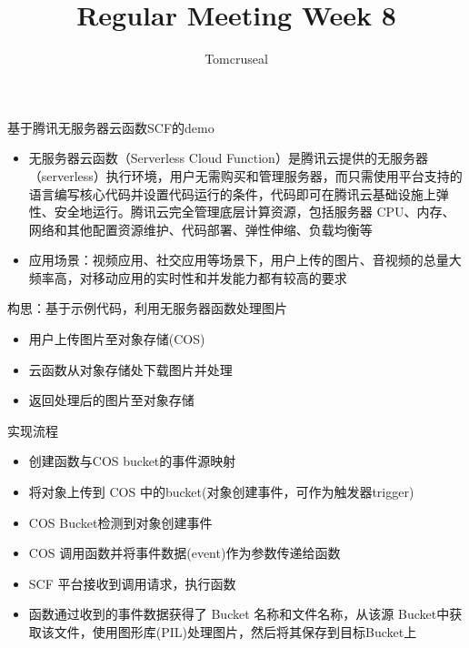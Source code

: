 \documentclass{beamer}
\author{Tomcruseal}
\title{Regular Meeting Week 8}
\institute{School of Computer Science and Technology SCUT }
\begin{document}
	\frame{\titlepage}
	



   
    \begin{frame}基于腾讯无服务器云函数SCF的demo
    	\begin{itemize}
    		\item 无服务器云函数（Serverless Cloud Function）是腾讯云提供的无服务器（serverless）执行环境，用户无需购买和管理服务器，而只需使用平台支持的语言编写核心代码并设置代码运行的条件，代码即可在腾讯云基础设施上弹性、安全地运行。腾讯云完全管理底层计算资源，包括服务器 CPU、内存、网络和其他配置资源维护、代码部署、弹性伸缩、负载均衡等
    	\end{itemize}
        
    \end{frame}
    
    \begin{frame}
    	\begin{itemize}
    		\item 应用场景：视频应用、社交应用等场景下，用户上传的图片、音视频的总量大频率高，对移动应用的实时性和并发能力都有较高的要求
        \end{itemize}
    \end{frame}

    \begin{frame}构思：基于示例代码，利用无服务器函数处理图片
        \begin{itemize}
        	\item 用户上传图片至对象存储(COS)
        	\item 云函数从对象存储处下载图片并处理
        	\item 返回处理后的图片至对象存储
        \end{itemize}
    \end{frame}

    \begin{frame}实现流程
    	\begin{itemize}
    	    \item 创建函数与COS bucket的事件源映射
    	    \item 将对象上传到 COS 中的bucket(对象创建事件，可作为触发器trigger)
    	    \item COS Bucket检测到对象创建事件
    	    \item COS 调用函数并将事件数据(event)作为参数传递给函数
    	    \item SCF 平台接收到调用请求，执行函数
    	    \item 函数通过收到的事件数据获得了 Bucket 名称和文件名称，从该源 Bucket中获取该文件，使用图形库(PIL)处理图片，然后将其保存到目标Bucket上
    	\end{itemize}
    \end{frame}
\end{document}
